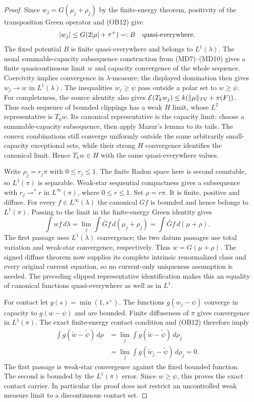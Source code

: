 \documentclass[11pt,a4paper]{article}
\numberwithin{equation}{section}
\theoremstyle{definition}
\theoremstyle{remark}
\begin{document}
\begin{proof}
Since $w_j=G(\mu_j+\rho_j)$ by the finite-energy theorem, positivity
of the transposition Green operator and (OB12) give
\[
                  |w_j|\le G(2|\mu|+\tau^+)=:B
                                        \quad\hbox{quasi-everywhere}.
\]
The fixed potential $B$ is finite quasi-everywhere and belongs to
$L^1(\lambda)$.  The usual summable-capacity subsequence construction
from (MD7)--(MD10) gives a finite quasicontinuous limit $w$ and
capacity convergence of the whole sequence.  Coercivity implies
convergence in $\lambda$-measure; the displayed domination then
gives $w_j\to w$ in $L^1(\lambda)$.  The inequalities $w_j\ge\psi$
pass outside a polar set to $w\ge\psi$.
For completeness, the source identity also gives
$\mathcal E(T_kw_j)\le k(\|\mu\|_{\rm TV}+\pi(F))$.
Thus each sequence of bounded clippings has a weak $H$ limit, whose
$L^2$ representative is $T_kw$.  Its canonical representative is the
capacity limit: choose a summable-capacity subsequence, then apply
Mazur's lemma to its tails.  The convex combinations still converge
uniformly outside the same arbitrarily small-capacity exceptional
sets, while their strong $H$ convergence identifies the canonical
limit.  Hence $T_kw\in H$ with the same quasi-everywhere values.

Write $\rho_j=r_j\pi$ with $0\le r_j\le1$.  The finite Radon
space here is second countable, so $L^1(\pi)$ is separable.
Weak-star sequential compactness gives a subsequence with
$r_j\rightharpoonup^*r$ in $L^\infty(\pi)$, where $0\le r\le1$.
Set $\rho=r\pi$.  It is finite, positive and diffuse.  For every
$f\in L^\infty(\lambda)$ the canonical $Gf$ is bounded and hence
belongs to $L^1(\pi)$.  Passing to the limit in the finite-energy
Green identity gives
\[
 \int wf\,d\lambda
       =\lim_j\int\widetilde{Gf}\,d(\mu_j+\rho_j)
       =\int\widetilde{Gf}\,d(\mu+\rho).
 \tag{OB14}
\]
The first passage uses $L^1(\lambda)$ convergence; the two datum
passages use total variation and weak-star convergence, respectively.
Thus $w=G(\mu+\rho)$.  The signed diffuse theorem now supplies its
complete intrinsic renormalized class and every original current
equation, so no current-only uniqueness assumption is needed.
The preceding clipped representative identification makes this an
equality of canonical functions quasi-everywhere as well as in $L^1$.

For contact let $g(s)=\min(1,s^+)$.  The functions
$g(w_j-\psi)$ converge in capacity to $g(w-\psi)$ and are bounded.
Finite diffuseness of $\pi$ gives convergence in $L^1(\pi)$.
The exact finite-energy contact condition and (OB12) therefore imply
\[
 \begin{split}
 \int g(\widetilde w-\widetilde\psi)\,d\rho
 &=\lim_j\int g(\widetilde w-\widetilde\psi)\,d\rho_j\\
 &=\lim_j\int g(\widetilde w_j-\widetilde\psi)\,d\rho_j=0.
 \end{split}
 \tag{OB15}
\]
The first passage is weak-star convergence against the fixed bounded
function.  The second is bounded by the $L^1(\pi)$ error.  Since
$w\ge\psi$, this proves the exact contact carrier.  In particular
the proof does not restrict an uncontrolled weak measure limit to a
discontinuous contact set.


\end{proof}
\end{document}
